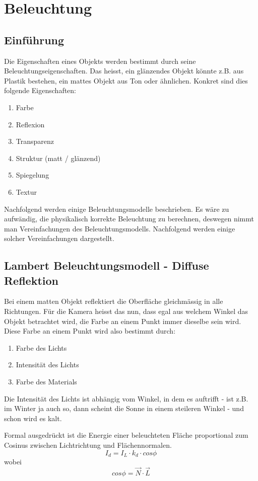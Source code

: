 \chapter{Beleuchtung}

\section{Einführung}
Die Eigenschaften eines Objekts werden bestimmt durch seine Beleuchtungseigenschaften. Das heisst, ein glänzendes Objekt könnte z.B. aus Plastik bestehen, ein mattes Objekt aus Ton oder ähnlichen. Konkret sind dies folgende Eigenschaften:
\begin{enumerate}
	\item Farbe
	\item Reflexion
	\item Transparenz
	\item Struktur (matt / glänzend)
	\item Spiegelung
	\item Textur
\end{enumerate}
Nachfolgend werden einige Beleuchtungsmodelle beschrieben. Es wäre zu aufwändig, die physikalisch korrekte Beleuchtung zu berechnen, deswegen nimmt man Vereinfachungen des Beleuchtungsmodells. Nachfolgend werden einige solcher Vereinfachungen dargestellt.
\section{Lambert Beleuchtungsmodell - Diffuse Reflektion}

Bei einem matten Objekt reflektiert die Oberfläche gleichmässig in alle Richtungen. Für die Kamera heisst das nun, dass egal aus welchem Winkel das Objekt betrachtet wird, die Farbe an einem Punkt immer dieselbe sein wird. Diese Farbe an einem Punkt wird also bestimmt durch:
\begin{enumerate}
	\item Farbe des Lichts
	\item Intensität des Lichts
	\item Farbe des Materials
\end{enumerate}
Die Intensität des Lichts ist abhängig vom Winkel, in dem es auftrifft - ist z.B. im Winter ja auch so, dann scheint die Sonne in einem steileren Winkel - und schon wird es kalt.

Formal ausgedrückt ist die Energie einer beleuchteten Fläche proportional zum Cosinus zwischen Lichtrichtung und Flächennormalen.
\begin{displaymath}
I_d = I_L \cdot  k_d \cdot  cos \phi
\end{displaymath}
wobei 
\begin{displaymath}
cos \phi = \vec{N}\cdot \vec{L}
\end{displaymath}

